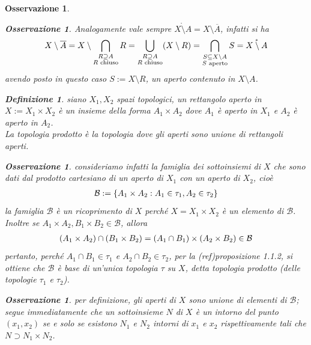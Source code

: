 \documentclass[oneside, 11pt]{amsbook}
\newcommand{\0}{{(0)}}
\newcommand{\3}{{(3)}}
\theoremstyle{colonplain}
\theoremstyle{colondefinition}
\newtheorem{defn}[thm]{Definizione}
\theoremstyle{colonremark}
\newtheorem{rmk}[thm]{Osservazione}
\numberwithin{equation}{chapter}
\begin{document}
\begin{rmk}
\begin{rmk}
Analogamente vale sempre $\mathring{X \setminus A} = X \setminus \overline{A}$, infatti si ha
\begin{align}
    X \setminus \overline{A} = X \setminus \bigcap_{\substack{R \supseteq A \\ R \text{ chiuso}}} R = \bigcup_{\substack{R \supseteq A \\ R \text{ chiuso}}} (X \setminus R) = \bigcap_{\substack{S \subseteq X \setminus A \\ S \text{ aperto}}} S = \mathring{X \setminus A} \notag
\end{align}
avendo posto in questo caso $S := X \setminus R$, un aperto contenuto in $X \setminus A$.
\end{rmk}
\begin{defn}
siano $X_1, X_2$ spazi topologici, un rettangolo aperto in $X := X_1 \times X_2$ è un insieme della forma $A_1 \times A_2$ dove $A_1$ è aperto in $X_1$ e $A_2$ è aperto in $A_2$. \\
La \textit{topologia prodotto} è la topologia dove gli aperti sono unione di rettangoli aperti.
\end{defn}
\begin{rmk}
consideriamo infatti la famiglia dei sottoinsiemi di $X$ che sono dati dal prodotto cartesiano di un aperto di $X_1$ con un aperto di $X_2$, cioè
\begin{align}
    \mathcal{B} := \{ A_1 \times A_2 : A_1 \in \tau_1, A_2 \in \tau_2 \} \notag
\end{align}
la famiglia $\mathcal{B}$ è un ricoprimento di $X$ perché $X = X_1 \times X_2$ è un elemento di $\mathcal{B}$. Inoltre se $A_1 \times A_2, B_1 \times B_2 \in \mathcal{B}$, allora
\begin{align}
    (A_1 \times A_2) \cap (B_1 \times B_2) = (A_1 \cap B_1) \times (A_2 \times B_2) \in \mathcal{B} \notag
\end{align}
pertanto, perché $A_1 \cap B_1 \in \tau_1$ e $A_2 \cap B_2 \in \tau_2$, per la (ref)\textit{proposizione 1.1.2}, si ottiene che $\mathcal{B}$ è base di un'unica topologia $\tau$ su $X$, detta \textit{topologia prodotto} (delle topologie $\tau_1$ e $\tau_2$).
\end{rmk}
\begin{rmk}
per definizione, gli aperti di $X$ sono unione di elementi di $\mathcal{B}$; segue immediatamente che un sottoinsieme $N$ di $X$ è un intorno del punto $(x_1, x_2)$ se e solo se esistono $N_1$ e $N_2$ intorni di $x_1$ e $x_2$ rispettivamente tali che $N \supset N_1 \times N_2$. \\ \\

\end{rmk}
\end{rmk}
\end{document}
